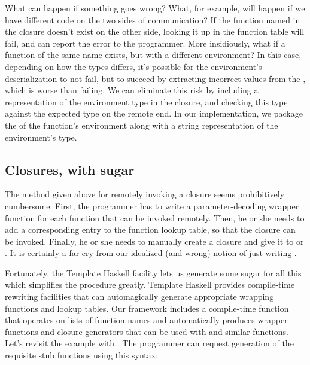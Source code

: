 \documentclass[preprint]{sigplanconf}
\begin{document}
What can happen if something goes wrong? What, for example, will happen if we have different code on the two sides of communication? If the function named in the closure doesn't exist on the other side, looking it up in the function table will fail, and  can report the error to the programmer. More insidiously, what if a function of the same name exists, but with a different environment? In this case, depending on how the types differs, it's possible for the environment's deserialization to not fail, but to succeed by extracting incorrect values from the , which is worse than failing. We can eliminate this risk by including a representation of the environment type in the closure, and checking this type against the expected type on the remote end. In our implementation, we package the  of the function's environment along with a string representation of the environment's type.


\subsection{Closures, with sugar}

The method given above for remotely invoking a closure seems prohibitively cumbersome. First, the programmer has to write a parameter-decoding wrapper function for each function that can be invoked remotely. Then, he or she needs to add a corresponding entry to the function lookup table, so that the closure can be invoked. Finally, he or she needs to manually create a closure and give it to  or . It is certainly a far cry from our idealized (and wrong) notion of just writing .

Fortunately, the Template Haskell facility lets us generate some sugar for all this which simplifies the procedure greatly. Template Haskell provides compile-time rewriting facilities that can automagically generate appropriate wrapping functions and lookup tables. Our framework includes a compile-time  function that operates on lists of function names and automatically produces wrapper functions and closure-generators that can be used with  and similar functions. Let's revisit the example with . The programmer can request generation of the requisite stub functions using this syntax:

\end{document}
